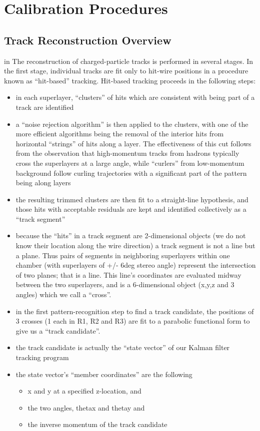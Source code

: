 \section{Calibration Procedures}

\subsection{Track Reconstruction Overview}

 in
The reconstruction of charged-particle tracks is performed in several stages.  In 
the first stage, individual tracks are fit only to hit-wire positions in a 
procedure known as ``hit-based'' tracking.  Hit-based tracking proceeds
in the following steps:
\begin{itemize}
\item in each superlayer, ``clusters'' of hits which are consistent with
being part of a track are identified
\item a ``noise rejection algorithm'' is then applied to the clusters, 
with one of the more efficient algorithms being the removal of the
interior hits from horizontal ``strings'' of hits along a layer.
The effectiveness of this cut follows from the observation that
high-momentum tracks from hadrons typically cross the superlayers
at a large angle, while ``curlers'' from low-momentum background
follow curling trajectories with a significant part of the pattern
being along layers
\item the resulting trimmed clusters are then fit to a straight-line hypothesis,
and those hits with acceptable residuals are kept and identified collectively
as a ``track segment''
\item because the ``hits'' in a track segment are 2-dimensional objects (we
do not know their location along the wire direction) a track segment is not
a line but a plane.  Thus pairs of segments in neighboring superlayers within
one chamber (with superlayers of +/- 6deg stereo angle) represent the
intersection of two planes; that is a line.  This line's coordinates 
are evaluated midway between the two superlayers, and is a 6-dimensional
object (x,y,z and 3 angles) which we call a ``cross''.
\item in the first pattern-recognition step to find a track candidate,
the positions of 3 crosses (1 each in R1, R2 and R3) are fit to a
parabolic functional form to give us a ``track candidate''.
\item the track candidate is actually the ``state vector'' of our
Kalman filter tracking program
\item the state vector's ``member coordinates'' are the following
\begin{itemize}
\item x and y at a specified z-location, and
\item the two angles, thetax and thetay and
\item the inverse momentum of the track candidate
\end{itemize} 

\end{itemize} 

